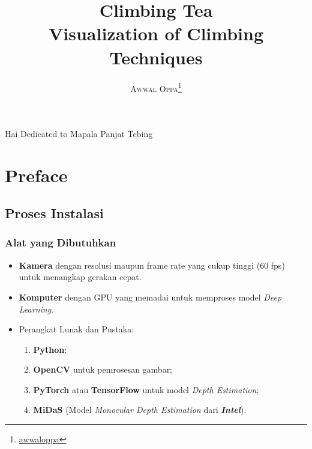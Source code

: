 \documentclass[a4paper,11pt]{book}
\title{\Huge \textbf{Climbing Tea} \\ Visualization of Climbing Techniques\\}
\author{\textsc{Awwal Oppa}\thanks{\hyperref[www.google.com]{awwaloppa}}}
\newenvironment{dedication}
{
   \cleardoublepage
   \thispagestyle{empty}
   \vspace*{\stretch{1}}
   \hfill\begin{minipage}[t]{0.66\textwidth}
   \raggedright
}
{
   \end{minipage}
   \vspace*{\stretch{3}}
   \clearpage
}
\begin{document}
\frontmatter
\maketitle
\begin{dedication}
	Hai Dedicated to Mapala Panjat Tebing 
\end{dedication}
\tableofcontents
\listoffigures
\listoftables

\mainmatter
\chapter*{Preface}

\section*{Proses Instalasi}
\subsection*{Alat yang Dibutuhkan}
\begin{itemize}
	\item \textbf{Kamera} dengan resolusi maupun frame rate yang cukup tinggi (60 fps) untuk menangkap gerakan cepat.
	\item \textbf{Komputer} dengan GPU yang memadai untuk memproses model \textit{Deep Learning}.
	\item Perangkat Lunak dan Pustaka:
	\begin{enumerate}
		\item \textbf{Python};
		\item \textbf{OpenCV} untuk pemrosesan gambar;
		\item \textbf{PyTorch} atau \textbf{TensorFlow} untuk model \textit{Depth Estimation};
		\item \textbf{MiDaS} (Model \textit{Monocular Depth Estimation} dari \textit{\textbf{Intel}}).
	\end{enumerate}
\end{itemize}
\end{document}

